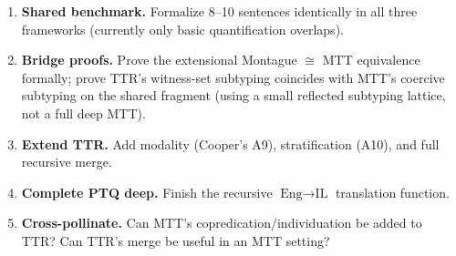 \documentclass[11pt,a4paper]{article}
\begin{document}
\begin{enumerate}
\item \textbf{Shared benchmark.} Formalize 8--10 sentences identically in all three frameworks (currently only basic quantification overlaps).
\item \textbf{Bridge proofs.} Prove the extensional Montague $\cong$ MTT equivalence formally; prove TTR's witness-set subtyping coincides with MTT's coercive subtyping on the shared fragment (using a small reflected subtyping lattice, not a full deep MTT).
\item \textbf{Extend TTR.} Add modality (Cooper's A9), stratification (A10), and full recursive merge.
\item \textbf{Complete PTQ deep.} Finish the recursive $\text{Eng} \to \text{IL}$ translation function.
\item \textbf{Cross-pollinate.} Can MTT's copredication/individuation be added to TTR? Can TTR's merge be useful in an MTT setting?
\end{enumerate}
\end{document}
